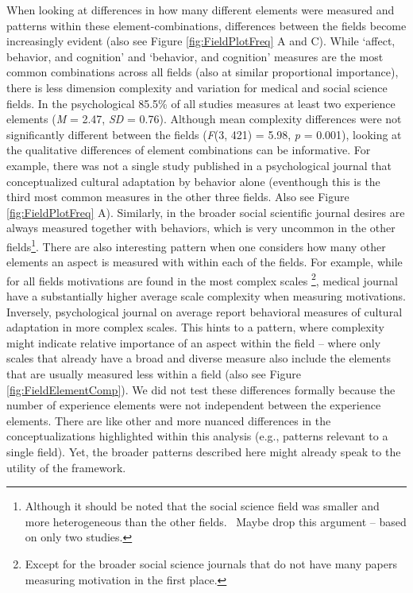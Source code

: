 When looking at differences in how many different elements were measured
and patterns within these element-combinations, differences between the
fields become increasingly evident (also see Figure
\ref{fig:FieldPlotFreq} A and C). While `affect, behavior, and
cognition' and `behavior, and cognition' measures are the most common
combinations across all fields (also at similar proportional
importance), there is less dimension complexity and variation for
medical and social science fields. In the psychological 85.5\% of all
studies measures at least two experience elements (\textit{M} = 2.47,
\textit{SD} = 0.76). Although mean complexity differences were not
significantly different between the fields (\textit{F}(3, 421) = 5.98,
\textit{p} = 0.001), looking at the qualitative differences of element
combinations can be informative. For example, there was not a single
study published in a psychological journal that conceptualized cultural
adaptation by behavior alone (eventhough this is the third most common
measures in the other three fields. Also see Figure
\ref{fig:FieldPlotFreq} A). Similarly, in the broader social scientific
journal desires are always measured together with behaviors, which is
very uncommon in the other
fields\footnote{Although it should be noted that the social science field was smaller and more heterogeneous than the other fields. \Warning\ Maybe drop this argument -- based on only two studies.}.
There are also interesting pattern when one considers how many other
elements an aspect is measured with within each of the fields. For
example, while for all fields motivations are found in the most complex
scales
\footnote{Except for the broader social science journals that do not have many papers measuring motivation in the first place.},
medical journal have a substantially higher average scale complexity
when measuring motivations. Inversely, psychological journal on average
report behavioral measures of cultural adaptation in more complex
scales. This hints to a pattern, where complexity might indicate
relative importance of an aspect within the field -- where only scales
that already have a broad and diverse measure also include the elements
that are usually measured less within a field (also see Figure
\ref{fig:FieldElementComp}). We did not test these differences formally
because the number of experience elements were not independent between
the experience elements. There are like other and more nuanced
differences in the conceptualizations highlighted within this analysis
(e.g., patterns relevant to a single field). Yet, the broader patterns
described here might already speak to the utility of the framework.

